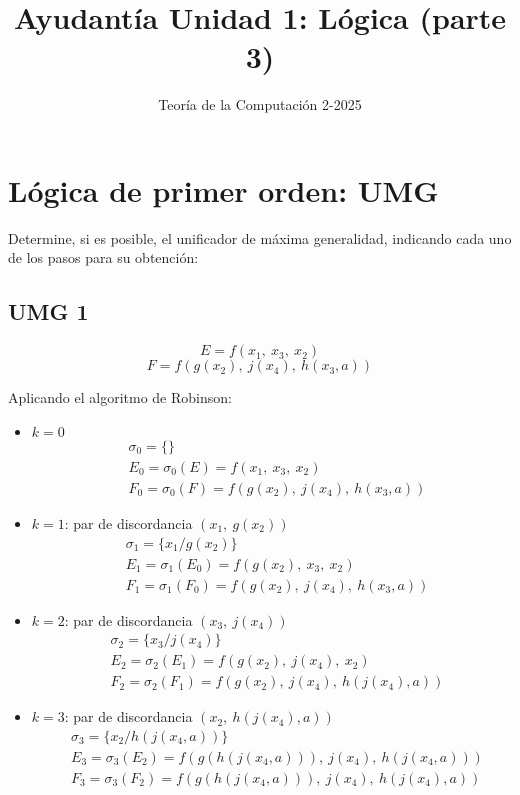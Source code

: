 \documentclass{article}
\begin{document}
\title{Ayudantía Unidad 1: Lógica (parte 3)}
\author{Teoría de la Computación 2-2025}
\date{}

\maketitle

\section{Lógica de primer orden: UMG}

Determine, si es posible, el unificador de máxima generalidad, indicando cada uno de los pasos para su obtención:

\subsection{UMG 1}

$$E = f(x_{1},\ x_{3},\ x_{2})$$
$$F = f(g(x_{2}),\ j(x_{4}),\ h(x_{3}, a))$$

Aplicando el algoritmo de Robinson:

\begin{itemize}
  \item $k = 0$
  \begin{align*}
    &\sigma_{0} = \{\}\\
    &E_{0} = \sigma_{0}(E) = f(x_{1},\ x_{3},\ x_{2})\\
    &F_{0} = \sigma_{0}(F) = f(g(x_{2}),\ j(x_{4}),\ h(x_{3}, a))
  \end{align*}


  \item $k = 1$: par de discordancia $(x_{1},\ g(x_{2}))$
  \begin{align*}
    &\sigma_{1} = \{x_{1} / g(x_{2})\}\\
    &E_{1} = \sigma_{1}(E_{0}) = f(g(x_{2}),\ x_{3},\ x_{2})\\
    &F_{1} = \sigma_{1}(F_{0}) = f(g(x_{2}),\ j(x_{4}),\ h(x_{3}, a))
  \end{align*}


  \item $k = 2$: par de discordancia $(x_{3},\ j(x_{4}))$
  \begin{align*}
    &\sigma_{2} = \{x_{3}/j(x_{4})\}\\
    &E_{2} = \sigma_{2}(E_{1}) = f(g(x_{2}),\ j(x_{4}),\ x_{2})\\
    &F_{2} = \sigma_{2}(F_{1}) = f(g(x_{2}),\ j(x_{4}),\ h(j(x_{4}), a))
  \end{align*}


  \item $k = 3$: par de discordancia $(x_{2},\ h(j(x_{4}), a))$
  \begin{align*}
    &\sigma_{3} = \{x_{2}/h(j(x_{4}, a))\}\\
    &E_{3} = \sigma_{3}(E_{2}) = f(g(h(j(x_{4}, a))),\ j(x_{4}),\ h(j(x_{4}, a)))\\
    &F_{3} = \sigma_{3}(F_{2}) = f(g(h(j(x_{4}, a))),\ j(x_{4}),\ h(j(x_{4}), a))
  \end{align*}
\end{itemize}
\end{document}
